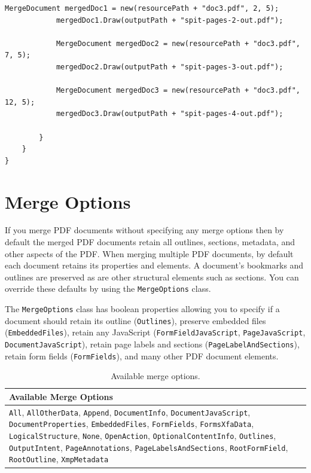 \documentclass[american]{tufte-book}
\providecommand{\tabularnewline}{\\}
\numberwithin{equation}{section}
\numberwithin{figure}{section}
\begin{document}
{{\begin{lstlisting}[caption={Splitting a PDF.},label={lis:Splitting-a-PDF.},basicstyle={\footnotesize\ttfamily},breaklines=true]
            MergeDocument mergedDoc1 = new(resourcePath + "doc3.pdf", 2, 5);
            mergedDoc1.Draw(outputPath + "spit-pages-2-out.pdf");

            MergeDocument mergedDoc2 = new(resourcePath + "doc3.pdf", 7, 5);
            mergedDoc2.Draw(outputPath + "spit-pages-3-out.pdf");

            MergeDocument mergedDoc3 = new(resourcePath + "doc3.pdf", 12, 5);
            mergedDoc3.Draw(outputPath + "spit-pages-4-out.pdf");

        }
    }
}
\end{lstlisting}
\leavevmode\egroup
\section{Merge Options}

If you merge PDF documents without specifying any merge options then
by default the merged PDF documents retain all outlines, sections,
metadata, and other aspects of the PDF. When merging multiple PDF
documents, by default each document retains its properties and elements.
A document's bookmarks and outlines are preserved as are other structural
elements such as sections. You can override these defaults by using
the \texttt{MergeOptions} class.

The \texttt{MergeOptions} class has boolean properties allowing you
to specify if a document should retain its outline (\texttt{Outlines}),
preserve embedded files (\texttt{EmbeddedFiles}), retain any JavaScript
(\texttt{FormFieldJavaScript}, \texttt{PageJavaScript}, \texttt{DocumentJavaScript}),
retain page labels and sections (\texttt{PageLabelAndSections}), retain
form fields (\texttt{FormFields}), and many other PDF document elements. 

\begin{table}
\begin{tabular}{>{\raggedright}p{}}
\toprule 
{\small Available Merge Options}\tabularnewline
\midrule 
{\small\texttt{All}}{\small , }{\small\texttt{AllOtherData}}{\small ,
}{\small\texttt{Append}}{\small , }{\small\texttt{DocumentInfo}}{\small ,
}{\small\texttt{DocumentJavaScript}}{\small , }{\small\texttt{DocumentProperties}}{\small ,
}{\small\texttt{EmbeddedFiles}}{\small , }{\small\texttt{FormFields}}{\small ,
}{\small\texttt{FormsXfaData}}{\small , }{\small\texttt{LogicalStructure}}{\small ,
}{\small\texttt{None}}{\small , }{\small\texttt{OpenAction}}{\small ,
}{\small\texttt{OptionalContentInfo}}{\small , }{\small\texttt{Outlines}}{\small ,
}{\small\texttt{OutputIntent}}{\small , }{\small\texttt{PageAnnotations}}{\small ,
}{\small\texttt{PageLabelsAndSections}}{\small , }{\small\texttt{RootFormField}}{\small ,
}{\small\texttt{RootOutline}}{\small , }{\small\texttt{XmpMetadata}}\tabularnewline
\bottomrule
\end{tabular}\caption{Available merge options.}\label{tab:Available-merge-options.}


\end{table}}}
\end{document}
